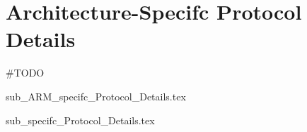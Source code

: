 \section{Architecture-Specifc Protocol Details}
\#TODO

{sub_ARM_specifc_Protocol_Details.tex}

{sub_specifc_Protocol_Details.tex}
